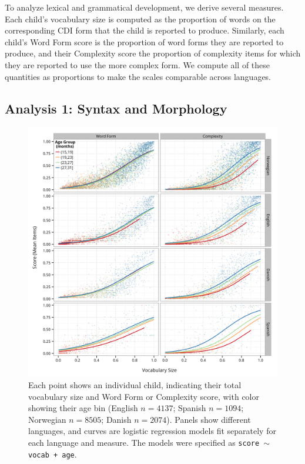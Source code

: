 \documentclass[10pt,letterpaper]{article}
\begin{document}
To analyze lexical and grammatical development, we derive several measures. Each child's vocabulary size is computed as the proportion of words on the corresponding CDI form that the child is reported to produce. Similarly, each child's Word Form score is the proportion of word forms they are reported to produce, and their Complexity score the proportion of complexity items for which they are reported to use the more complex form. We compute all of these quantities as proportions to make the scales comparable across languages.

\subsection{Analysis 1: Syntax and Morphology}

\begin{figure}[t!]
\centering
\includegraphics[width=.72\textwidth]{plots/grammar_data_plot-1.png}
\caption{\label{fig:grammar} Each point shows an individual child, indicating their total vocabulary size and Word Form or Complexity score, with color showing their age bin (English $n=4137$; Spanish $n=1094$; Norwegian $n=8505$; Danish $n=2074$). Panels show different languages, and curves are logistic regression models fit separately for each language and measure. The models were specified as {\small{\tt{score $\sim$ vocab + age}}}.} 
\end{figure}
\end{document}
